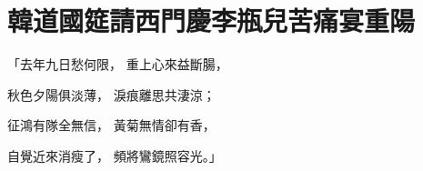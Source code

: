 %

\chapter{韓道國筵請西門慶\KG 李瓶兒苦痛宴重陽}


\begin{showcontents}{}



「去年九日愁何限，  重上心來益斷腸，

秋色夕陽俱淡薄，  淚痕離思共淒涼；

征鴻有隊全無信，  黃菊無情卻有香，

自覺近來消瘦了，  頻將鸞鏡照容光。」


\end{showcontents}
